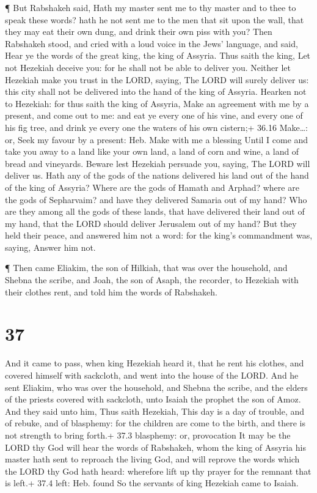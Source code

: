  ¶ But Rabshakeh said, Hath my master sent me to thy master
and to thee to speak these words? hath he not sent me to the men that
sit upon the wall, that they may eat their own dung, and drink their own
piss with you?  Then Rabshakeh stood, and cried with a loud
voice in the Jews' language, and said, Hear ye the words of the great
king, the king of Assyria.  Thus saith the king, Let not
Hezekiah deceive you: for he shall not be able to deliver you.
 Neither let Hezekiah make you trust in the LORD, saying,
The LORD will surely deliver us: this city shall not be delivered into
the hand of the king of Assyria.  Hearken not to Hezekiah:
for thus saith the king of Assyria, Make an agreement with me by a
present, and come out to me: and eat ye every one of his vine, and every
one of his fig tree, and drink ye every one the waters of his own
cistern;+ 36.16 Make\ldots: or, Seek my favour by a present: Heb. Make
with me a blessing  Until I come and take you away to a
land like your own land, a land of corn and wine, a land of bread and
vineyards.  Beware lest Hezekiah persuade you, saying, The
LORD will deliver us. Hath any of the gods of the nations delivered his
land out of the hand of the king of Assyria?  Where are the
gods of Hamath and Arphad? where are the gods of Sepharvaim? and have
they delivered Samaria out of my hand?  Who are they among
all the gods of these lands, that have delivered their land out of my
hand, that the LORD should deliver Jerusalem out of my hand?
 But they held their peace, and answered him not a word:
for the king's commandment was, saying, Answer him not.

 ¶ Then came Eliakim, the son of Hilkiah, that was over the
household, and Shebna the scribe, and Joah, the son of Asaph, the
recorder, to Hezekiah with their clothes rent, and told him the words of
Rabshakeh.

\hypertarget{section-36}{%
\section{37}\label{section-36}}

 And it came to pass, when king Hezekiah heard it, that he
rent his clothes, and covered himself with sackcloth, and went into the
house of the LORD.  And he sent Eliakim, who was over the
household, and Shebna the scribe, and the elders of the priests covered
with sackcloth, unto Isaiah the prophet the son of Amoz. 
And they said unto him, Thus saith Hezekiah, This day is a day of
trouble, and of rebuke, and of blasphemy: for the children are come to
the birth, and there is not strength to bring forth.+ 37.3 blasphemy:
or, provocation  It may be the LORD thy God will hear the
words of Rabshakeh, whom the king of Assyria his master hath sent to
reproach the living God, and will reprove the words which the LORD thy
God hath heard: wherefore lift up thy prayer for the remnant that is
left.+ 37.4 left: Heb. found  So the servants of king
Hezekiah came to Isaiah.

